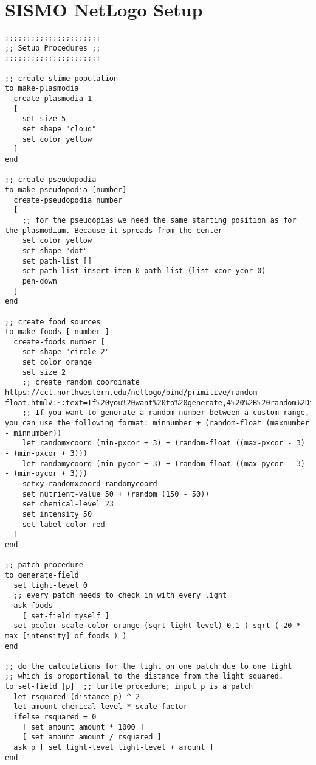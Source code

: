\section{SISMO NetLogo Setup}
\begin{lstlisting}
;;;;;;;;;;;;;;;;;;;;;;
;; Setup Procedures ;;
;;;;;;;;;;;;;;;;;;;;;;

;; create slime population
to make-plasmodia
  create-plasmodia 1
  [
    set size 5
    set shape "cloud"
    set color yellow
  ]
end

;; create pseudopodia
to make-pseudopodia [number]
  create-pseudopodia number
  [
    ;; for the pseudopias we need the same starting position as for the plasmodium. Because it spreads from the center
    set color yellow
    set shape "dot"
    set path-list []
    set path-list insert-item 0 path-list (list xcor ycor 0)
    pen-down
  ]
end

;; create food sources
to make-foods [ number ]
  create-foods number [
    set shape "circle 2"
    set color orange
    set size 2
    ;; create random coordinate https://ccl.northwestern.edu/netlogo/bind/primitive/random-float.html#:~:text=If%20you%20want%20to%20generate,4%20%2B%20random%2Dfloat%203%20.
    ;; If you want to generate a random number between a custom range, you can use the following format: minnumber + (random-float (maxnumber - minnumber))
    let randomxcoord (min-pxcor + 3) + (random-float ((max-pxcor - 3) - (min-pxcor + 3)))
    let randomycoord (min-pycor + 3) + (random-float ((max-pycor - 3) - (min-pycor + 3)))
    setxy randomxcoord randomycoord
    set nutrient-value 50 + (random (150 - 50))
    set chemical-level 23
    set intensity 50
    set label-color red
  ]
end

;; patch procedure
to generate-field
  set light-level 0
  ;; every patch needs to check in with every light
  ask foods
    [ set-field myself ]
  set pcolor scale-color orange (sqrt light-level) 0.1 ( sqrt ( 20 * max [intensity] of foods ) )
end

;; do the calculations for the light on one patch due to one light
;; which is proportional to the distance from the light squared.
to set-field [p]  ;; turtle procedure; input p is a patch
  let rsquared (distance p) ^ 2
  let amount chemical-level * scale-factor
  ifelse rsquared = 0
    [ set amount amount * 1000 ]
    [ set amount amount / rsquared ]
  ask p [ set light-level light-level + amount ]
end
\end{lstlisting}

